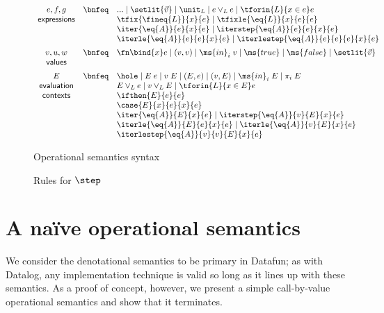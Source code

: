 \begin{figure}
  \[\begin{array}{ccl}
    e,f,g
    &\bnfeq& ... \pipe \setlit{\vec{v}} \pipe \unit_L \pipe e \vee_L e \pipe \tforin{L}{x \in e} e\\
    \textsf{expressions}
    && \tfix{\fineq{L}}{x}{e} \pipe \tfixle{\eq{L}}{x}{e}{e}\\
    && \iter{\eq{A}}{e}{x}{e} \pipe \iterstep{\eq{A}}{e}{e}{x}{e}\\
    && \iterle{\eq{A}}{e}{e}{x}{e} \pipe \iterlestep{\eq{A}}{e}{e}{e}{x}{e}
    \vspace{0.5em}\\
    v,u,w
    &\bnfeq& \fn\bind{x} e \pipe (v, v) \pipe \ms{in}_i\; v
    \pipe \ms{true} \pipe \ms{false} \pipe \setlit{\vec{v}}\\
    \textsf{values}
    \vspace{0.5em}\\
    E
    &\bnfeq& \hole \pipe E\;e \pipe v\;E \pipe (E, e) \pipe (v, E) \pipe \ms{in}_i\;E
    \pipe \pi_i \; E\\
    \textsf{evaluation}
    && E \vee_L e \pipe v \vee_L E \pipe \tforin{L}{x \in E} e\\
    \textsf{contexts}
    && \ifthen{E}{e}{e}\\
    && \case{E}{x}{e}{x}{e}\\
    && \iter{\eq{A}}{E}{x}{e} \pipe \iterstep{\eq{A}}{v}{E}{x}{e}\\
    && \iterle{\eq{A}}{E}{e}{x}{e} \pipe \iterle{\eq{A}}{v}{E}{x}{e}\\
    && \iterlestep{\eq{A}}{v}{v}{E}{x}{e}
  \end{array}\]
  \caption{Operational semantics syntax}
  \label{fig:opsem-syntax}
\end{figure}

\begin{figure}
  
  \caption{Rules for $\step$}
  \label{fig:opsem-rules}
\end{figure}


\section{A na\"ive operational semantics}

We consider the denotational semantics to be primary in Datafun; as with
Datalog, any implementation technique is valid so long as it lines up with these
semantics. As a proof of concept, however, we present a simple call-by-value
operational semantics and show that it terminates.

